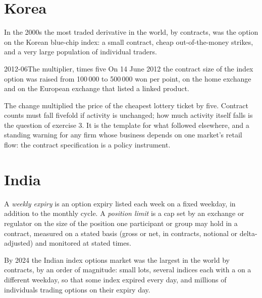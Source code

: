 \section{Korea}

In the 2000s the most traded derivative in the world, by contracts, was the
option on the Korean blue-chip index: a small contract, cheap
out-of-the-money strikes, and a very large population of individual
traders.

\begin{dated}{2012-06}{The multiplier, times five}\label{dat:m1:options-markets-europe-asia:kospi}
On 14 June 2012 the contract size of the index option was raised from 100\,000
to 500\,000 won per point, on the home exchange and on the European exchange
that listed a linked product.
\end{dated}

The change multiplied the price of the cheapest lottery ticket by five.
Contract counts must fall fivefold if activity is unchanged; how much
activity itself falls is the question of exercise 3. It is the
template for what followed elsewhere, and a standing warning for any firm
whose business depends on one market's retail flow: the contract
specification is a policy instrument.

\section{India}

\begin{definition}\label{def:m1:options-markets-europe-asia:weekly}
A \emph{weekly expiry} is an option expiry listed each
week on a fixed weekday, in addition to the monthly cycle. A \emph{position
limit} is a cap set by an exchange or regulator on the
size of the position one participant or group may hold in a contract,
measured on a stated basis (gross or net, in contracts, notional or
delta-adjusted) and monitored at stated times.
\end{definition}

By 2024 the Indian index options market was the largest in the world by
contracts, by an order of magnitude: small lots, several indices each with a
 on a different weekday, so that some index expired every day,
and millions of individuals trading options on their expiry day.

